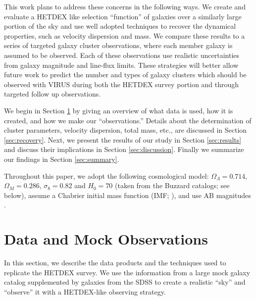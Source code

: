 \documentclass[fleqn,usenatbib]{mnras}
\begin{document}
This work plans to address these concerns in the following ways. We create and evaluate a HETDEX like selection ``function'' of galaxies over a similarly large portion of the sky and use well adopted techniques to recover the dynamical properties, such as velocity dispersion and mass. We compare these results to a series of targeted galaxy cluster observations, where each member galaxy is assumed to be observed. Each of these observations use realistic uncertainties from galaxy magnitude and line-flux limits. These strategies will better allow future work to predict the number and types of galaxy clusters which should be observed with VIRUS during both the HETDEX survey portion and through targeted follow up observations.

We begin in Section \ref{sec:Data} by giving an overview of what data is used, how it is created, and how we make our ``observations.'' Details about the determination of cluster parameters, velocity dispersion, total mass, etc., are discussed in Section \ref{sec:recovery}. Next, we present the results of our study in Section \ref{sec:results} and discuss their implications in Section \ref{sec:discussion}. Finally we summarize our findings in Section \ref{sec:summary}.

Throughout this paper, we adopt the following cosmological model: $\Omega_\Lambda = 0.714$, $\Omega_M = 0.286$, $\sigma_8 = 0.82$ and $H_0= 70$ \kms \mpc (taken from the Buzzard catalogs; see below), assume a Chabrier initial mass function (IMF; \citealt{Chabrier2003}), and use AB magnitudes \citep{Oke1974}.

\section{Data and Mock Observations}\label{sec:Data}
In this section, we describe the data products and the techniques used to replicate the HETDEX survey. We use the information from a large mock galaxy catalog supplemented by galaxies from the SDSS to create a realistic ``sky'' and ``observe'' it with a HETDEX-like observing strategy.
\end{document}
